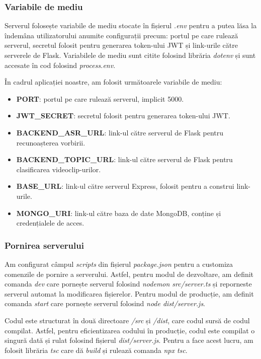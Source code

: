 \subsubsection{Variabile de mediu}
Serverul folosește variabile de mediu stocate în fișierul \textit{.env} pentru a putea lăsa
la îndemâna utilizatorului anumite configurații precum: portul pe care rulează serverul, secretul
folosit pentru generarea token-ului JWT și link-urile către serverele de Flask. Variabilele de mediu
sunt citite folosind librăria \textit{dotenv} și sunt accesate în cod folosind \textit{process.env}.
\par
În cadrul aplicației noastre, am folosit următoarele variabile de mediu:
\begin{itemize}
    \item \textbf{PORT}: portul pe care rulează serverul, implicit 5000.
    \item \textbf{JWT\_SECRET}: secretul folosit pentru generarea token-ului JWT.
    \item \textbf{BACKEND\_ASR\_URL}: link-ul către serverul de Flask pentru recunoașterea vorbirii.
    \item \textbf{BACKEND\_TOPIC\_URL}: link-ul către serverul de Flask pentru clasificarea videoclip-urilor.
    \item \textbf{BASE\_URL}: link-ul către serverul Express, folosit pentru a construi link-urile.
    \item \textbf{MONGO\_URI}: link-ul către baza de date MongoDB, conține și credențialele de acces.
\end{itemize}


\subsubsection{Pornirea serverului}
Am configurat câmpul \textit{scripts} din fișierul \textit{package.json} pentru a customiza
comenzile de pornire a serverului. Astfel, pentru modul de dezvoltare, am definit comanda
\textit{dev} care pornește serverul folosind \textit{nodemon src/server.ts} și reporneste serverul
automat la modificarea fișierelor. Pentru modul de producție, am definit comanda \textit{start}
care pornește serverul folosind \textit{node dist/server.js}.
\par
Codul este structurat în două directoare \textit{/src} și \textit{/dist}, care codul sursă de codul compilat.
Astfel, pentru eficientizarea codului în producție, codul este compilat o singură dată și rulat
folosind fișierul \textit{dist/server.js}. Pentru a face acest lucru, am folosit librăria \textit{tsc}
care dă \textit{build} și rulează comanda \textit{npx tsc}.


